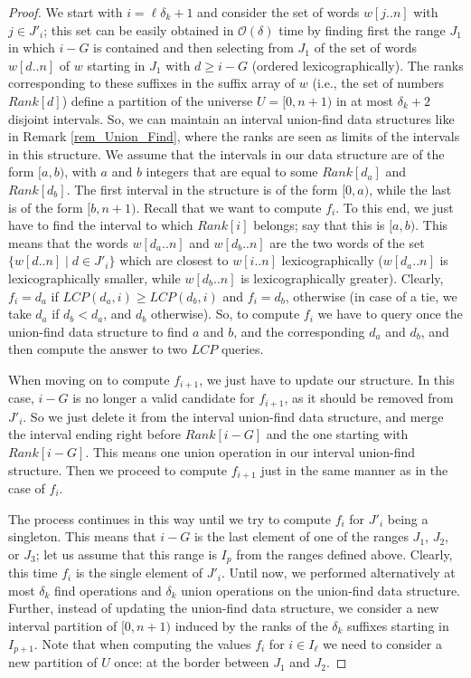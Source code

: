 \documentclass[final]{dmtcs-episciences}
\newcommand{\bigo}{{\mathcal O}}
\newcommand{\LCP}{{\mathit{LCP}}}
\begin{document}
\begin{proof}
We start with $i=\ell\delta_k+1$ and consider the set of words $w[j..n]$ with $j\in J'_i$; this set can be easily obtained in $\bigo(\delta)$ time by finding first the range $J_1$ in which $i-G$ is contained and then selecting from $J_1$ of the set of words $w[d..n]$ of $w$ starting in $J_1$ with $d\geq i-G$ (ordered lexicographically). The ranks corresponding to these suffixes in the suffix array of $w$ (i.e., the set of numbers $Rank[d]$) define a partition of the universe $U=[0,n+1)$ in at most $\delta_k+2$ disjoint intervals. So, we can maintain an interval union-find data structures like in Remark \ref{rem_Union_Find}, where the ranks are seen as limits of the intervals in this structure. We assume that the intervals in our data structure are of the form $[a,b)$, with $a$ and $b$ integers that are equal to some $Rank[d_a]$ and $Rank[d_b]$. The first interval in the structure is of the form $[0,a)$, while the last is of the form $[b,n+1)$. Recall that we want to compute $f_i$. To this end, we just have to find the interval to which $Rank[i]$ belongs; say that this is $[a,b)$. This means that the words $w[d_a..n]$ and $w[d_b..n]$ are the two words of the set $\{w[d..n]\mid d\in J'_i\}$ which are closest to $w[i..n]$ lexicographically ($w[d_a..n]$ is lexicographically smaller, while $w[d_b..n]$ is lexicographically greater). Clearly, $f_i=d_a$ if $\LCP(d_a,i)\geq \LCP(d_b,i)$ and $f_i=d_b$, otherwise (in case of a tie, we take $d_a$ if $d_b<d_a$, and $d_b$ otherwise). So, to compute $f_i$ we have to query once the union-find data structure to find $a$ and $b$, and the corresponding $d_a$ and $d_b$, and then compute the answer to two $\LCP$ queries. 

When moving on to compute $f_{i+1}$, we just have to update our structure. In this case, $i-G$ is no longer a valid candidate for $f_{i+1}$, as it should be removed from $J'_i$. So we just delete it from the interval union-find data structure, and merge the interval ending right before $Rank[i-G]$ and the one starting with $Rank[i-G]$. This means one union operation in our interval union-find structure. Then we proceed to compute $f_{i+1}$ just in the same manner as in the case of $f_i$.

The process continues in this way until we try to compute $f_i$ for $J'_i$ being a singleton. This means that $i-G$ is the last element of one of the ranges $J_1$, $J_2$, or $J_3$; let us assume that this range is $I_p$ from the ranges defined above. Clearly, this time $f_i$ is the single element of $J'_i$. Until now, we performed alternatively at most $\delta_k$ find operations and $\delta_k$ union operations on the union-find data structure. Further, instead of updating the union-find data structure, we consider a new interval partition of $[0,n+1)$ induced by the ranks of the $\delta_k$ suffixes starting in $I_{p+1}$. Note that when computing the values $f_i$ for $i\in I_\ell$ we need to consider a new partition of $U$ once: at the border between $J_1$ and $J_2$.


\end{proof}
\end{document}
